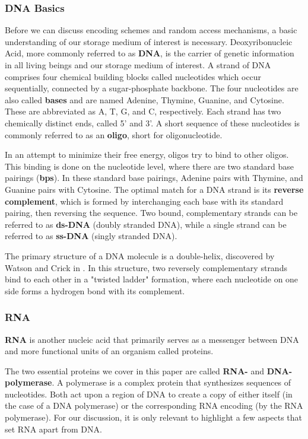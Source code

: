 \documentclass[a4paper,conference]{IEEEtran}
\begin{document}
\subsubsection{DNA Basics}
Before we can discuss encoding schemes and random access mechanisms, a basic understanding of our storage medium of interest is necessary. Deoxyribonucleic Acid, more commonly referred to as \textbf{DNA}, is the carrier of genetic information in all living beings and our storage medium of interest. A strand of DNA comprises four chemical building blocks called nucleotides which occur sequentially, connected by a sugar-phosphate backbone. The four nucleotides are also called \textbf{bases} and are named Adenine, Thymine, Guanine, and Cytosine. These are abbreviated as A, T, G, and C, respectively. Each strand has two chemically distinct ends, called 5' and 3'. A short sequence of these nucleotides is commonly referred to as an \textbf{oligo}, short for oligonucleotide.

In an attempt to minimize their free energy, oligos try to bind to other oligos. This binding is done on the nucleotide level, where there are two standard base pairings (\textbf{bps}). In these standard base pairings, Adenine pairs with Thymine, and Guanine pairs with Cytosine. The optimal match for a DNA strand is its \textbf{reverse complement}, which is formed by interchanging each base with its standard pairing, then reversing the sequence. Two bound, complementary strands can be referred to as \textbf{ds-DNA} (doubly stranded DNA), while a single strand can be referred to as \textbf{ss-DNA} (singly stranded DNA).

The primary structure of a DNA molecule is a double-helix, discovered by Watson and Crick in \cite{watson_molecular_1953}. In this structure, two reversely complementary strands bind to each other in a "twisted ladder" formation, where each nucleotide on one side forms a hydrogen bond with its complement.

\subsubsection{RNA}

\textbf{RNA} is another nucleic acid that primarily serves as a messenger between DNA and more functional units of an organism called proteins.

The two essential proteins we cover in this paper are called \textbf{RNA-} and \textbf{DNA-polymerase}. A polymerase is a complex protein that synthesizes sequences of nucleotides. Both act upon a region of DNA to create a copy of either itself (in the case of a DNA polymerase) or the corresponding RNA encoding (by the RNA polymerase). For our discussion, it is only relevant to highlight a few aspects that set RNA apart from DNA.
\end{document}
